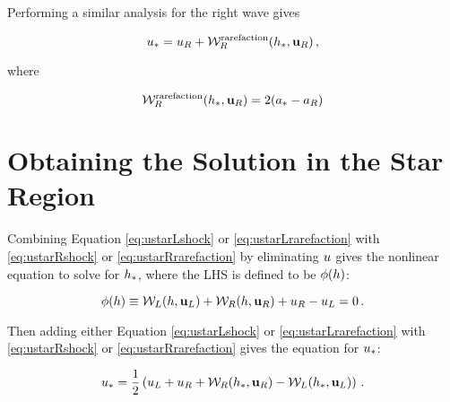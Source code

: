 Performing a similar analysis for the right wave gives

\begin{equation}\label{eq:ustarRrarefaction}
  u_* = u_R
    + \mathcal{W}^{\text{rarefaction}}_R(h_*,\mathbf{u}_R)
    \,,
\end{equation}

where

\begin{equation}
  \mathcal{W}_R^{\text{rarefaction}}(h_*,\mathbf{u}_R)
    = 2(a_* - a_R)
\end{equation}

\section{Obtaining the Solution in the Star Region}

Combining Equation \eqref{eq:ustarLshock} or \eqref{eq:ustarLrarefaction}
with \eqref{eq:ustarRshock} or \eqref{eq:ustarRrarefaction} by eliminating
$u$ gives the nonlinear
equation to solve for $h_*$, where the LHS is defined to be $\phi(h)$:

\begin{equation}
  \phi(h) \equiv
    \mathcal{W}_L(h,\mathbf{u}_L)
    + \mathcal{W}_R(h,\mathbf{u}_R)
    + u_R - u_L
    = 0 \,.
\end{equation}

Then adding either Equation \eqref{eq:ustarLshock} or \eqref{eq:ustarLrarefaction}
with \eqref{eq:ustarRshock} or \eqref{eq:ustarRrarefaction} gives the equation
for $u_*$:

\begin{equation}
  u_* = \frac{1}{2}\left(u_L + u_R
    + \mathcal{W}_R(h_*,\mathbf{u}_R)
    - \mathcal{W}_L(h_*,\mathbf{u}_L)\right)
    \,.
\end{equation}

\pagebreak{}

